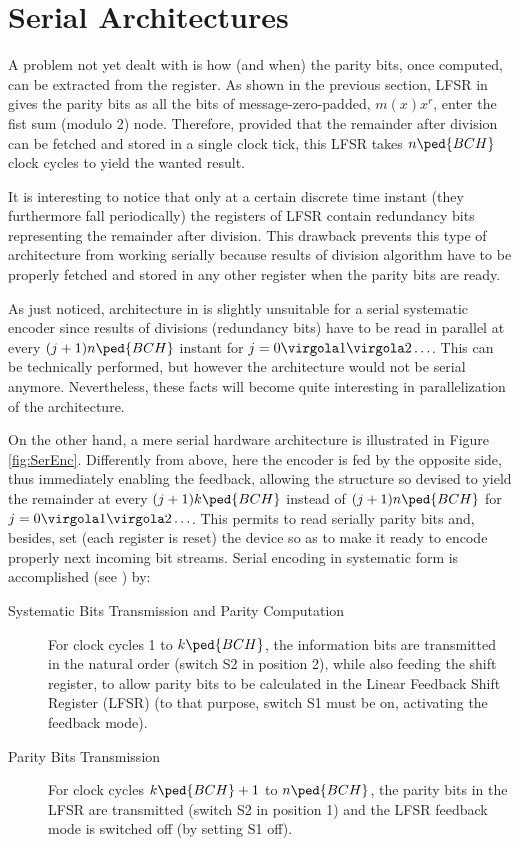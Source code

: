 \section{Serial Architectures} \label{sec:SArch}

A problem not yet dealt with is how (and when) the parity bits, once computed, can be extracted from the register. As shown in the previous section, LFSR in   gives the parity bits as all the bits of message-zero-padded, \(m(x)x^r\), enter the fist sum (modulo 2) node. Therefore, provided that the remainder after division can be fetched and stored in a single clock tick, this LFSR takes \(n\ped{BCH}\) clock cycles to yield the wanted result.

It is interesting to notice that only at a certain discrete time instant (they furthermore fall periodically) the registers of LFSR contain redundancy bits representing the remainder after division. This drawback prevents this type of architecture from working serially because results of division algorithm have to be properly fetched and stored in any other register when the parity bits are ready.

As just noticed, architecture in  is slightly unsuitable for a serial systematic encoder since results of divisions (redundancy bits) have to be read in parallel at every \((j+1) n\ped{BCH}\) instant for \(j= 0 \virgola 1 \virgola 2 \ldots\). This can be technically performed, but however the architecture would not be serial anymore. Nevertheless, these facts will become quite interesting in parallelization of the architecture.

On the other hand, a mere serial hardware architecture is illustrated in Figure \ref{fig:SerEnc}. Differently from above, here the encoder is fed by the opposite side, thus immediately enabling the feedback, allowing the structure so devised to yield the remainder at every $(j+1) k\ped{BCH}$ instead of $(j+1) n\ped{BCH}$ for  \(j= 0 \virgola 1 \virgola 2 \ldots\). This permits to read serially parity bits and, besides, set (each register is reset) the device so as to make it ready to encode properly next incoming bit streams.
Serial encoding in systematic form is accomplished (see ) by:

\begin{description}
\item[ Systematic Bits Transmission and Parity Computation]
For clock cycles 1 to $k\ped{BCH}$, the information bits are transmitted in the natural order (switch S2 in position 2), while also feeding the shift register, to allow parity bits to be calculated in the Linear Feedback Shift Register (LFSR) (to that purpose, switch S1 must be on, activating the feedback mode).
\item[Parity Bits Transmission]
For clock cycles $k\ped{BCH}+1$ to $n\ped{BCH}$, the parity bits in the LFSR are transmitted (switch S2 in position 1) and the LFSR feedback mode is switched off (by setting S1 off).
\end{description}

